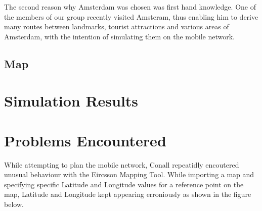 \documentclass[a4paper,12pt]{article}
\begin{document}
The second reason why Amsterdam was chosen was first hand knowledge. One
of the members of our group recently visited Amsteram, thus enabling him
to derive many routes between landmarks, tourist attractions and various
areas of Amsterdam, with the intention of simulating them on the mobile
network.

\subsection{Map}

\section{Simulation Results}

\section{Problems Encountered}

While attempting to plan the mobile network, Conall repeatidly
encoutered unusual behaviour with the Eircsson Mapping Tool. While
importing a map and specifying specific Latitude and Longitude values
for a reference point on the map, Latitude and Longitude kept appearing
erroniously as shown in the figure below.
\end{document}
